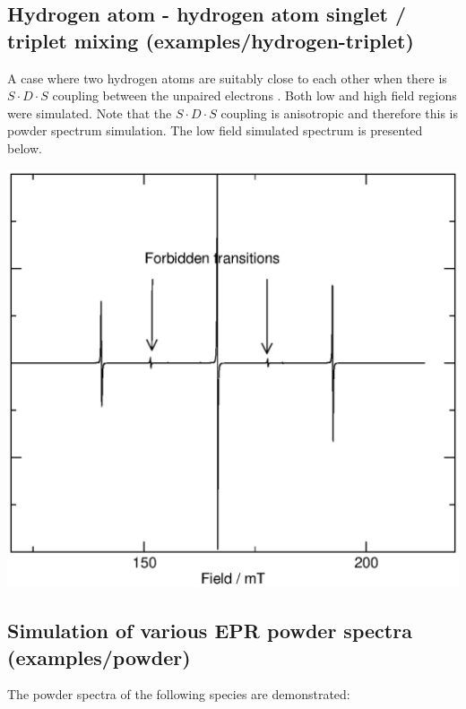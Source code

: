 \documentclass[byrevtex,amssymb,aps,pra,floatfix,letterpaper]{revtex4}
\begin{document}
\subsection{Hydrogen atom - hydrogen atom singlet / triplet mixing (examples/hydrogen-triplet)}

A case where two hydrogen atoms are suitably close to each other when there is $S\cdot D\cdot S$ coupling between the unpaired electrons \cite{knight}. Both low and high field regions were simulated. Note that the $S\cdot D\cdot S$ coupling is anisotropic and therefore this is powder spectrum simulation. The low field simulated spectrum is presented below.

\begin{center}
\includegraphics*[scale=0.4]{fig11}
\end{center}

\subsection{Simulation of various EPR powder spectra (examples/powder)}

\noindent
The powder spectra of the following species are demonstrated:
\end{document}
